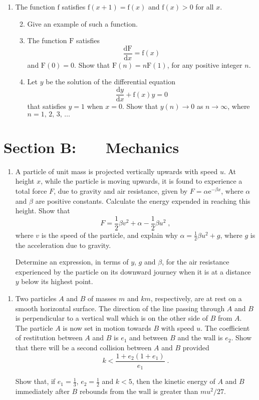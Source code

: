 \documentclass[a4, 11pt]{report}
\newlength{\qspace}
\newcounter{qnumber}
\newenvironment{question}%
 {\vspace{\qspace}
  \begin{enumerate}[\bfseries 1\quad][10]%
    \setcounter{enumi}{\value{qnumber}}%
    \item%
 }
{
  \end{enumerate}
  \filbreak
  \stepcounter{qnumber}
 }
\newenvironment{questionparts}[1][1]%
 {
  \begin{enumerate}[\bfseries (i)]%
    \setcounter{enumii}{#1}
    \addtocounter{enumii}{-1}
    \setlength{\itemsep}{5mm}
    \setlength{\parskip}{8pt}
 }
 {
  \end{enumerate}
 }
\def\d{{\mathrm d}}
\def\e{{\mathrm e}}
\def\f{{\mathrm f}}
\def\F{{\mathrm F}}
\begin{document}
\begin{question}	
The function $\f$ satisfies $\f(x+1)= \f(x)$ and $\f(x)>0$ for all $x$. 
\begin{questionparts}
\item
Give an example of such a function.
\item
The function $\F$ satisfies
\[
\frac{\d \F}{\d x} =\f(x)
\]
and $\F(0)=0$.
Show that $\F(n) = n\F(1)$, for any positive integer $n$.
\item
Let $y$ be the solution of the differential equation
\[
\frac{\d y}{\d x} +\f(x) y=0
\]
that satisfies $y=1$ when $x=0$. Show that $y(n) \to 0$ as $n\to\infty$, where
$n= 1,\,2,\, 3,\, \ldots$ 
\end{questionparts}
\end{question}	
		

		
	
\newpage
\section*{Section B: \ \ \ Mechanics}


	
\begin{question}
A particle of unit mass
is projected vertically upwards with speed $u$. At height $x$, while the 
particle is moving upwards,
it is found to experience a total force $F$, due to gravity and air resistance,
 given by $F=\alpha \e^{-\beta x}$, where
$\alpha$ and $\beta$ are positive constants. Calculate the energy expended in
reaching this height. Show that 
\[
F= {\textstyle \frac12} \beta v^2+ \alpha - {\textstyle \frac12} \beta u^2 \;,
\]
where $v$ is the speed of the particle, and explain why $ \alpha = \frac12 \beta u^2 +g$,
where $g$ is the acceleration due to gravity. 

Determine  an expression, in terms of $y$, $g$ and $\beta$,
 for the air resistance  experienced by the particle on its
downward journey when it is at a distance $y$ below its highest point.
	\end{question}
	
\begin{question}	
Two particles $A$ and $B$ of masses $m$ and $km$,
respectively, are at rest on a smooth horizontal surface.
The direction of the line passing through $A$ and $B$ is perpendicular 
to a vertical wall which is on the other side of $B$ from $A$.
The particle $A$ is now set in motion towards $B$ with speed $u$.
The coefficient of restitution between $A$ and $B$ is $e_1$
and between $B$ and the wall is $e_2$. Show that
there will be a second collision between $A$ and $B$ provided 
$$
k< \frac {1+e_2(1+e_1)} {e_1}\;.
$$


Show that, if $e_1=\frac13$, $e_2=\frac12$ and $k<5$, then
the kinetic energy of $A$ and $B$ immediately after $B$ rebounds from the 
wall is greater than $mu^2/27$.
\end{question}
\end{document}
